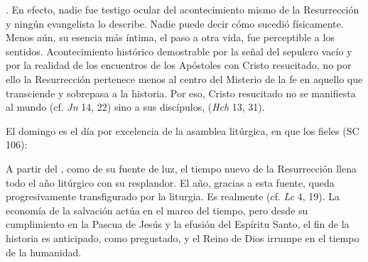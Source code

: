 \begin{ccebody}


 . En efecto, nadie fue testigo ocular del acontecimiento mismo de la Resurrección y ningún evangelista lo describe. Nadie puede decir cómo sucedió físicamente. Menos aún, su esencia más íntima, el paso a otra vida, fue perceptible a los sentidos. Acontecimiento histórico demostrable por la señal del sepulcro vacío y por la realidad de los encuentros de los Apóstoles con Cristo resucitado, no por ello la Resurrección pertenece menos al centro del Misterio de la fe en aquello que transciende y sobrepasa a la historia. Por eso, Cristo resucitado no se manifiesta al mundo (cf. \textit{Jn} 14, 22) sino a sus discípulos,  (\textit{Hch} 13, 31).

 El domingo es el día por excelencia de la asamblea litúrgica, en que los fieles  (SC 106):



 A partir del , como de su fuente de luz, el tiempo nuevo de la Resurrección llena todo el año litúrgico con su resplandor. El año, gracias a esta fuente, queda progresivamente transfigurado por la liturgia. Es realmente  (cf. \textit{Lc} 4, 19). La economía de la salvación actúa en el marco del tiempo, pero desde su cumplimiento en la Pascua de Jesús y la efusión del Espíritu Santo, el fin de la historia es anticipado, como pregustado, y el Reino de Dios irrumpe en el tiempo de la humanidad.


\end{ccebody}
